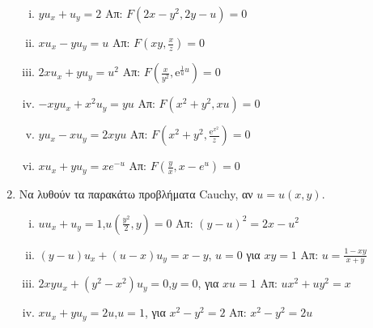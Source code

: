\begin{enumerate}
    \begin{enumerate}[i)]
      \item $yu_{x}+u_{y}=2$ \hfill Απ: $F(2x-y^{2},2y-u)=0$
      \item $ x u_{x}-yu_{y}=u $ \hfill Απ: $ F(xy, \frac{x}{z})=0 $
      \item $ 2x u_{x}+yu_{y}=u^{2} $ 
        \hfill Απ: $ F(\frac{x}{y^{2}},\mathrm{e}^{\frac{1}{u} u})=0 $ 
      \item $-xyu_{x}+x^{2}u_{y}=yu$ \hfill Απ: $F(x^{2}+y^{2},xu)=0$
      \item $ yu_{x}-xu_{y}=2xyu $ 
        \hfill Απ: $ F(x^{2}+y^{2}, \frac{\mathrm{e}^{x^{2}}}{z})=0 $  

      \item $xu_{x}+yu_{y}=xe^{-u}$ \hfill Απ: $F(\frac{y}{x},x-e^{u})=0$
    \end{enumerate}
  \item Να λυθούν τα παρακάτω προβλήματα Cauchy, αν $u=u(x,y)$.

    \begin{enumerate}[i)]
      \item $uu_{x}+u_{y}=1$,\quad $u(\frac{y^{2}}{2},y)=0$ 
        \hfill Απ: $(y-u)^{2}=2x-u^{2}$
      \item $ (y-u)u_{x}+(u-x)u_{y}=x-y $, \quad $ u=0 $ για $ xy=1 $
        \hfill Απ: $ u= \frac{1-xy}{x+y} $  

      \item $2xyu_{x}+(y^{2}-x^{2})u_{y}=0$,\quad $y=0$, για $xu=1$ 
        \hfill Απ: $ux^{2}+uy^{2}=x$
      \item $xu_{x}+yu_{y}=2u$,\quad $u=1$, για $x^{2}-y^{2}=2$ 
        \hfill Απ: $x^{2}-y^{2}=2u$
    \end{enumerate}


\end{enumerate}
